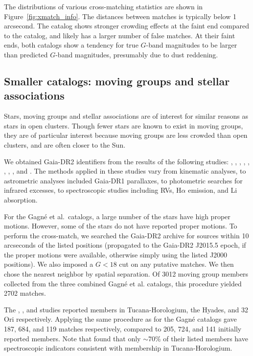 \documentclass[12pt,twocolumn,tighten]{aastex62}
\begin{document}
The distributions of various cross-matching statistics are shown in
Figure~\ref{fig:xmatch_info}.  The distances between matches is
typically below 1 arcsecond.  The \citeauthor{dias_proper_2014}
catalog shows stronger crowding effects at the faint end compared to
the \citeauthor{Kharchenko_et_al_2013} catalog, and likely has a
larger number of false matches.  At their faint ends, both catalogs
show a tendency for true $G$-band magnitudes to be larger than
predicted $G$-band magnitudes, presumably due to dust reddening.


\subsection{Smaller catalogs: moving groups and stellar associations}
\label{subsec:mg}

Stars, moving groups and stellar associations are of interest for
similar reasons as stars in open clusters.  Though fewer stars
are known to exist in moving groups, they are of particular interest
because moving groups are less crowded than open clusters, and are
often closer to the Sun.

We obtained Gaia-DR2 identifiers from the results of the following
studies:
\citet{gagne_banyan_XI_2018},
\citet{gagne_banyan_XII_2018},
\citet{gagne_banyan_XIII_2018},
\citet{kraus_tucanahor_2014},
\citet{roser_deep_2011}, %
\citet{bell_32ori_2017},
\citet{rizzuto_multidimensional_2011},
\citet{oh_comoving_2017}, and
\citet{zari_3d_2018}. The methods applied in these studies
vary from kinematic analyses, to astrometric analyses included
Gaia-DR1 parallaxes, to photometric searches for infrared excesses, to
spectroscopic studies including RVs, H$\alpha$
emission, and Li absorption.

For the Gagn\'e et al{.}~catalogs, a large number of the stars have
high proper motions.  However, some of the stars do not have reported
proper motions.  To perform the cross-match, we searched the Gaia-DR2
archive for sources within 10 arcseconds of the listed positions
(propagated to the Gaia-DR2 J2015.5 epoch, if the proper motions were
available, otherwise simply using the listed J2000 positions).  We
also imposed a $G<18$ cut on any putative matches.  We then chose the
nearest neighbor by spatial separation.  Of 3012 moving group members
collected from the three combined Gagn\'e et al{.} catalogs, this
procedure yielded 2702 matches.

The \citet{kraus_tucanahor_2014}, \citet{roser_deep_2011}, and
\citet{bell_32ori_2017} studies reported members in Tucana-Horologium,
the Hyades, and 32$\,$Ori respectively.  Applying the same procedure
as for the Gagn\'e catalogs gave 187, 684, and 119 matches
respectively, compared to 205, 724, and 141 initially reported
members.  Note that \citet{kraus_tucanahor_2014} found that only
$\sim$70\% of their listed members have spectroscopic indicators
consistent with membership in Tucana-Horologium.
\end{document}
